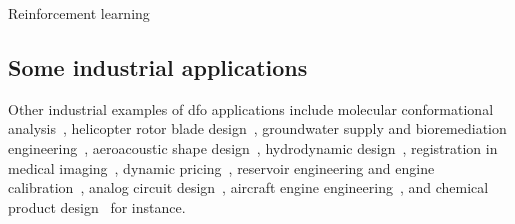 
Reinforcement learning~\cite{Qian_Yu_2021}

\subsection{Some industrial applications}

Other industrial examples of \gls{dfo} applications include molecular conformational analysis~\cite{Alberto_Etal_2004,Meza_Martinez_1994}, helicopter rotor blade design~\cite{Booker_Etal_1998a,Booker_Etal_1998b,Serafini_1998}, groundwater supply and bioremediation engineering~\cite{Fowler_Etal_2008,Mugunthan_Shoemaker_Regis_2005,Yoon_Shoemaker_1999}, aeroacoustic shape design~\cite{Marsden_2004,Marsden_Etal_2004}, hydrodynamic design~\cite{Duvigneau_Visonneau_2004}, registration in medical imaging~\cite{Oeuvray_2005,Oeuvray_Bierlaire_2007}, dynamic pricing~\cite{Levina_Etal_2009}, reservoir engineering and engine calibration~\cite{Langouet_2011}, analog circuit design~\cite{Latorre_Etal_2019}, aircraft engine engineering~\cite{Gazaix_Etal_2019}, and chemical product design~\cite{Sun_Etal_2020} for instance.

